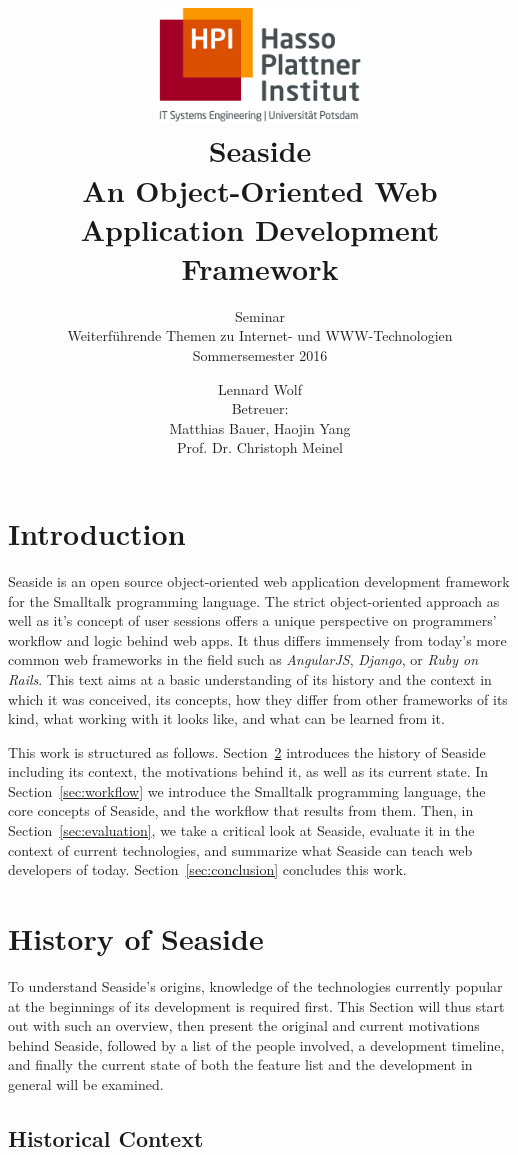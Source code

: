 \documentclass[a4paper,12pt,pagesize,headsepline,titlepage]{scrartcl}
\title{
	\includegraphics*[width=0.4\textwidth]{hpi_logo.png}\\
	\vspace{24pt}
	 Seaside\\An Object-Oriented Web Application Development Framework
}
\subtitle{
	Seminar\\
	Weiterführende Themen zu Internet- und WWW-Technologien\\
	Sommersemester 2016
}
\author{
	Lennard Wolf\\[12pt]
	Betreuer:\\
	Matthias Bauer, Haojin Yang\\
	Prof. Dr. Christoph Meinel
}
\begin{document}
\maketitle
\tableofcontents
\newpage

\section{Introduction}
Seaside is an open source object-oriented web application development framework for the Smalltalk programming language. The strict object-oriented approach as well as it's concept of user sessions offers a unique perspective on programmers' workflow and logic behind web apps. It thus differs immensely from today's more common web frameworks in the field such as \emph{AngularJS}, \emph{Django}, or \emph{Ruby on Rails}. This text aims at a basic understanding of its history and the context in which it was conceived, its concepts, how they differ from other frameworks of its kind, what working with it looks like, and what can be learned from it. 

This work is structured as follows. Section~\ref{sec:history} introduces the history of Seaside including its context, the motivations behind it, as well as its current state. In Section~\ref{sec:workflow} we introduce the Smalltalk programming language, the core concepts of Seaside, and the workflow that results from them. Then, in Section~\ref{sec:evaluation}, we take a critical look at Seaside, evaluate it in the context of current technologies, and summarize what Seaside can teach web developers of today. Section~\ref{sec:conclusion} concludes this work.


\section{History of Seaside}
\label{sec:history}
To understand Seaside's origins, knowledge of the technologies currently popular at the beginnings of its development is required first. This Section will thus start out with such an overview, then present the original and current motivations behind Seaside, followed by a list of the people involved, a development timeline, and finally the current state of both the feature list and the development in general will be examined.

\subsection{Historical Context}
\label{sec:context} 
\end{document}
